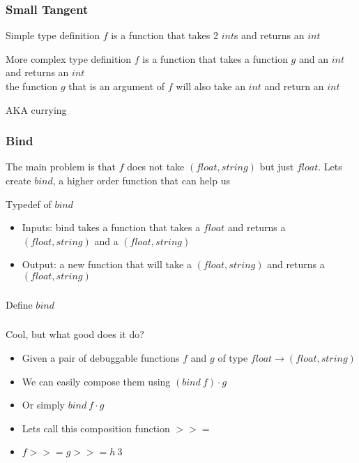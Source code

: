 \begin{frame}[fragile]
    \frametitle{Small Tangent}
    \begin{block}{Simple type definition}
        $f$ is a function that takes 2 $int$s and returns an $int$
        
    \end{block}
    \begin{block}{More complex type definition}
        $f$ is a function that takes a function $g$ and an $int$ and returns an $int$ \\
        the function $g$ that is an argument of $f$ will also take an $int$ and return an $int$
        
        AKA currying
    \end{block}
\end{frame}

\begin{frame}[fragile]
    \frametitle{Bind}
    \begin{block}{}
        The main problem is that $f$ does not take $(float, string)$ but just $float$. Lets create $bind$, a higher
        order function that can help us
    \end{block}
    \begin{block}{Typedef of $bind$}
        \begin{itemize}
            \item Inputs: bind takes a function that takes a $float$ and returns a $(float,string)$ and a $(float, string)$
            \item Output: a new function that will take a $(float, string)$ and returns a $(float, string)$
        \end{itemize}
        
    \end{block}
\end{frame}

\begin{frame}[fragile]
    \frametitle{}
    \begin{block}{Define $bind$}
        
    \end{block}
\end{frame}

\begin{frame}[fragile]
    \frametitle{}
    \begin{block}{Cool, but what good does it do?}
        \begin{itemize}
            \item Given a pair of debuggable functions $f$ and $g$ of type $float \rightarrow (float, string)$
            \item We can easily compose them using $(bind \: f) \cdot g$
            \item Or simply $bind \: f \cdot g$
            \item Lets call this composition function $>>=$
            \item $f >>= g >>= h \: 3$
        \end{itemize}
    \end{block}
\end{frame}

